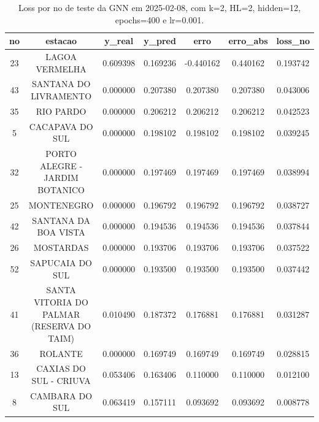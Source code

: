 \begin{table}[h]
\centering
\caption{Loss por no de teste da GNN em 2025-02-08, com k=2, HL=2, hidden=12, epochs=400 e lr=0.001.}
\label{tab:gnn_loss_k2_hl2_h12_e400_d20250208}
\begin{tabular}{ccccccc}
\toprule
no & estacao & y\_real & y\_pred & erro & erro\_abs & loss\_no \\
\midrule
23 & LAGOA VERMELHA & 0.609398 & 0.169236 & -0.440162 & 0.440162 & 0.193742 \\
43 & SANTANA DO LIVRAMENTO & 0.000000 & 0.207380 & 0.207380 & 0.207380 & 0.043006 \\
35 & RIO PARDO & 0.000000 & 0.206212 & 0.206212 & 0.206212 & 0.042523 \\
5 & CACAPAVA DO SUL & 0.000000 & 0.198102 & 0.198102 & 0.198102 & 0.039245 \\
32 & PORTO ALEGRE - JARDIM BOTANICO & 0.000000 & 0.197469 & 0.197469 & 0.197469 & 0.038994 \\
25 & MONTENEGRO & 0.000000 & 0.196792 & 0.196792 & 0.196792 & 0.038727 \\
42 & SANTANA DA BOA VISTA & 0.000000 & 0.194536 & 0.194536 & 0.194536 & 0.037844 \\
26 & MOSTARDAS & 0.000000 & 0.193706 & 0.193706 & 0.193706 & 0.037522 \\
52 & SAPUCAIA DO SUL & 0.000000 & 0.193500 & 0.193500 & 0.193500 & 0.037442 \\
41 & SANTA VITORIA DO PALMAR (RESERVA DO TAIM) & 0.010490 & 0.187372 & 0.176881 & 0.176881 & 0.031287 \\
36 & ROLANTE & 0.000000 & 0.169749 & 0.169749 & 0.169749 & 0.028815 \\
13 & CAXIAS DO SUL - CRIUVA & 0.053406 & 0.163406 & 0.110000 & 0.110000 & 0.012100 \\
8 & CAMBARA DO SUL & 0.063419 & 0.157111 & 0.093692 & 0.093692 & 0.008778 \\
\bottomrule
\end{tabular}
\end{table}

